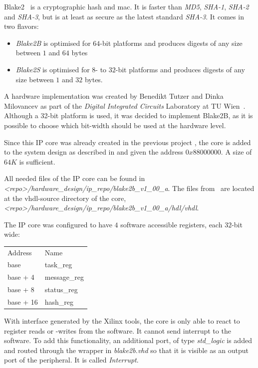 Blake2~\cite{blake2} is a cryptographic hash and \gls{mac}. It is faster than
\emph{MD5}, \emph{SHA-1}, \emph{SHA-2} and \emph{SHA-3}, but is at least as
secure as the latest standard \emph{SHA-3}.
It comes in two flavors:
\begin{itemize}
	\item \emph{Blake2B} is optimised for $64$-bit platforms and produces
		digests of any size between $1$ and $64$ bytes
	\item \emph{Blake2S} is optimised for $8$- to $32$-bit platforms and
		produces digests of any size between $1$ and $32$ bytes.
\end{itemize}

A hardware implementation was created by Benedikt Tutzer and Dinka Milovancev as
part of the \emph{Digital Integrated Circuits} Laboratory at TU
Wien~\cite{blake2hardware}.
Although a 32-bit platform is used, it was decided to implement Blake2B, as it is possible to choose which bit-width should be used at the hardware level.

Since this IP core was already created in the previous project \cite{oldrepo}, the core is added to the system design as described in
 and given the address $0x88000000$. A size of
$64K$ is sufficient.

All needed files of the IP core can be found in \emph{<repo>/hardware\_design/ip_repo/blake2b\_v1\_00\_a}.
The files from~\cite{blake2hardware} are located at the vhdl-source directory
of the core,\\
\emph{<repo>/hardware\_design/ip_repo/blake2b\_v1\_00\_a/hdl/vhdl}.

The IP core was configured to have $4$ software accessible registers, each $32$-bit wide:

\begin{tabular}{ll}
	Address & Name \\
	base     & task\_reg\\
	base + 4 & message\_reg\\
	base + 8 & status\_reg\\
	base + 16 & hash\_reg\\
\end{tabular}
\medbreak

With interface generated by the Xilinx tools, the core is only able to react to
register reads or -writes from the software.
It cannot send interrupt to the software.
To add this functionality, an additional port, of type \emph{std\_logic} is
added and routed through the wrapper in \emph{blake2b.vhd} so that it is
visible as an output port of the peripheral.
It is called \emph{Interrupt}.

